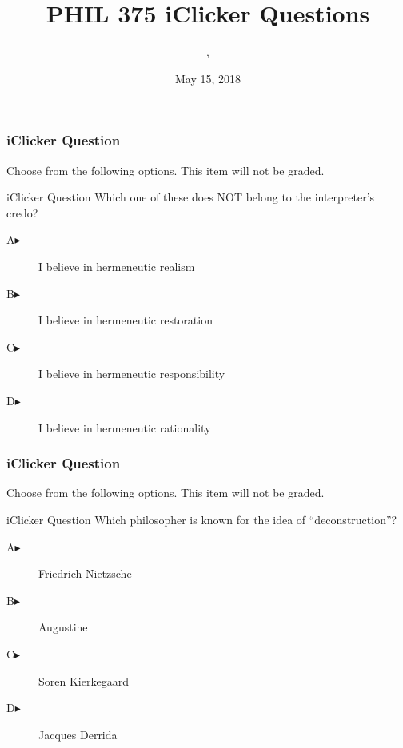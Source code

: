 \documentclass[xcolor=dvipsnames]{beamer}
\title{PHIL 375 iClicker Questions}
\subtitle{{\CourseNumber}, {\CourseInst}}
\author{\CourseName}
\date{May 15, 2018}
\begin{document}
\begin{frame}
  \titlepage
\end{frame}

\begin{frame}
  \frametitle{iClicker Question}
Choose from the following options. This item will not be graded.
\begin{block}{iClicker Question}
Which one of these does NOT belong to the interpreter's credo?
\end{block}
\begin{description}
\item[A\hspace{.2in}$\blacktriangleright$] I believe in hermeneutic realism
\item[B\hspace{.2in}$\blacktriangleright$] I believe in hermeneutic restoration
\item[C\hspace{.2in}$\blacktriangleright$] I believe in hermeneutic responsibility
\item[D\hspace{.2in}$\blacktriangleright$] I believe in hermeneutic rationality
\end{description}
\end{frame}

\begin{frame}
  \frametitle{iClicker Question}
Choose from the following options. This item will not be graded.
\begin{block}{iClicker Question}
Which philosopher is known for the idea of ``deconstruction''?
\end{block}
\begin{description}
\item[A\hspace{.2in}$\blacktriangleright$] Friedrich Nietzsche
\item[B\hspace{.2in}$\blacktriangleright$] Augustine
\item[C\hspace{.2in}$\blacktriangleright$] S{\/o}ren Kierkegaard
\item[D\hspace{.2in}$\blacktriangleright$] Jacques Derrida
\end{description}
\end{frame}
\end{document}
